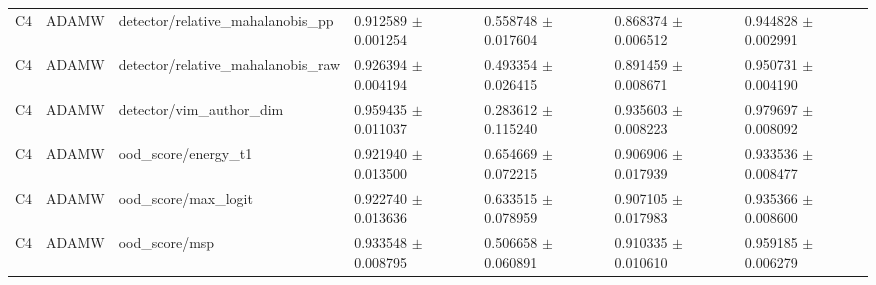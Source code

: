 \begin{longtable}{lllllll}
C4 & ADAMW & detector/relative\_mahalanobis\_pp & 0.912589 $\pm$ 0.001254 & 0.558748 $\pm$ 0.017604 & 0.868374 $\pm$ 0.006512 & 0.944828 $\pm$ 0.002991 \\
C4 & ADAMW & detector/relative\_mahalanobis\_raw & 0.926394 $\pm$ 0.004194 & 0.493354 $\pm$ 0.026415 & 0.891459 $\pm$ 0.008671 & 0.950731 $\pm$ 0.004190 \\
C4 & ADAMW & detector/vim\_author\_dim & 0.959435 $\pm$ 0.011037 & 0.283612 $\pm$ 0.115240 & 0.935603 $\pm$ 0.008223 & 0.979697 $\pm$ 0.008092 \\
C4 & ADAMW & ood\_score/energy\_t1 & 0.921940 $\pm$ 0.013500 & 0.654669 $\pm$ 0.072215 & 0.906906 $\pm$ 0.017939 & 0.933536 $\pm$ 0.008477 \\
C4 & ADAMW & ood\_score/max\_logit & 0.922740 $\pm$ 0.013636 & 0.633515 $\pm$ 0.078959 & 0.907105 $\pm$ 0.017983 & 0.935366 $\pm$ 0.008600 \\
C4 & ADAMW & ood\_score/msp & 0.933548 $\pm$ 0.008795 & 0.506658 $\pm$ 0.060891 & 0.910335 $\pm$ 0.010610 & 0.959185 $\pm$ 0.006279 \\
\end{longtable}
